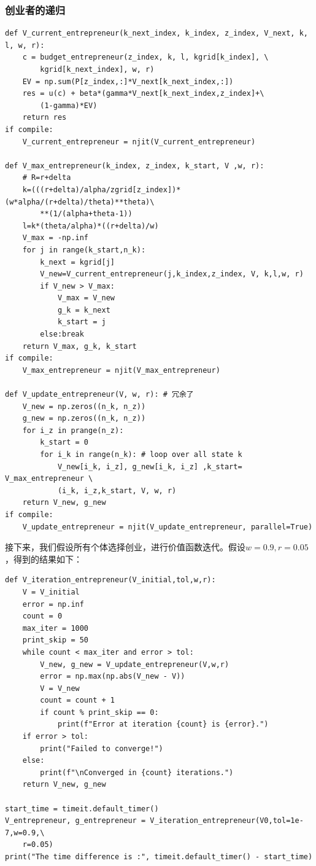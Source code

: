 \documentclass[a4paper, 12pt]{ctexart}
\begin{document}
\subsubsection{创业者的递归}

\begin{lstlisting}
def V_current_entrepreneur(k_next_index, k_index, z_index, V_next, k, l, w, r):
    c = budget_entrepreneur(z_index, k, l, kgrid[k_index], \
        kgrid[k_next_index], w, r)
    EV = np.sum(P[z_index,:]*V_next[k_next_index,:]) 
    res = u(c) + beta*(gamma*V_next[k_next_index,z_index]+\
        (1-gamma)*EV)
    return res
if compile:
    V_current_entrepreneur = njit(V_current_entrepreneur)

def V_max_entrepreneur(k_index, z_index, k_start, V ,w, r):
    # R=r+delta
    k=(((r+delta)/alpha/zgrid[z_index])*(w*alpha/(r+delta)/theta)**theta)\
        **(1/(alpha+theta-1))
    l=k*(theta/alpha)*((r+delta)/w)
    V_max = -np.inf
    for j in range(k_start,n_k):
        k_next = kgrid[j]
        V_new=V_current_entrepreneur(j,k_index,z_index, V, k,l,w, r)
        if V_new > V_max:
            V_max = V_new
            g_k = k_next
            k_start = j
        else:break
    return V_max, g_k, k_start
if compile:
    V_max_entrepreneur = njit(V_max_entrepreneur)

def V_update_entrepreneur(V, w, r): # 冗余了
    V_new = np.zeros((n_k, n_z))
    g_new = np.zeros((n_k, n_z))
    for i_z in prange(n_z): 
        k_start = 0
        for i_k in range(n_k): # loop over all state k
            V_new[i_k, i_z], g_new[i_k, i_z] ,k_start= V_max_entrepreneur \
            (i_k, i_z,k_start, V, w, r)
    return V_new, g_new
if compile:
    V_update_entrepreneur = njit(V_update_entrepreneur, parallel=True)
\end{lstlisting}
接下来，我们假设所有个体选择创业，进行价值函数迭代。假设$w=0.9,r=0.05$，得到的结果如下：
\begin{lstlisting}
def V_iteration_entrepreneur(V_initial,tol,w,r):
    V = V_initial
    error = np.inf
    count = 0
    max_iter = 1000
    print_skip = 50
    while count < max_iter and error > tol:
        V_new, g_new = V_update_entrepreneur(V,w,r)
        error = np.max(np.abs(V_new - V))
        V = V_new
        count = count + 1
        if count % print_skip == 0:
            print(f"Error at iteration {count} is {error}.")
    if error > tol:
        print("Failed to converge!")
    else:
        print(f"\nConverged in {count} iterations.")
    return V_new, g_new

start_time = timeit.default_timer()
V_entrepreneur, g_entrepreneur = V_iteration_entrepreneur(V0,tol=1e-7,w=0.9,\
    r=0.05)
print("The time difference is :", timeit.default_timer() - start_time)
\end{lstlisting}
\end{document}
